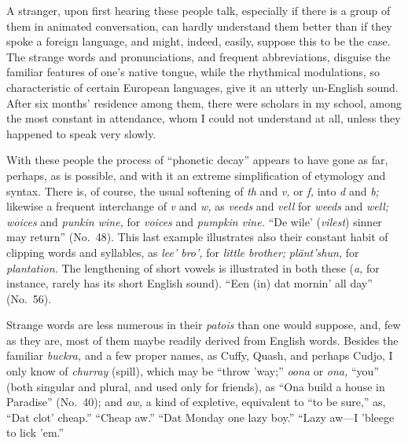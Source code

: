 \documentclass[a5paper,10pt]{book}
\begin{document}
A stranger, upon first hearing these people talk, especially if there
is a group of them in animated conversation, can hardly understand
them better than if they spoke a foreign language, and might, indeed,
easily, suppose this to be the case.  The strange words and
pronunciations, and frequent abbreviations, disguise the familiar
features of one's native tongue, while the rhythmical modulations, so
characteristic of certain European languages, give it an utterly
un-English sound.  After six months' residence among them, there were
scholars in my school, among the most constant in attendance, whom I
could not understand at all, unless they happened to speak very
slowly.

With these people the process of ``phonetic decay'' appears to have
gone as far, perhaps, as is possible, and with it an extreme
simplification of etymology and syntax.  There is, of course, the
usual softening of \emph{th} and \emph{v,} or \emph{f,} into \emph{d}
and \emph{b;} likewise a frequent interchange of \emph{v} and
\emph{w,} as \emph{veeds} and \emph{vell} for \emph{weeds} and
\emph{well;} \emph{woices} and \emph{punkin wine,} for \emph{voices}
and \emph{pumpkin vine.}  ``De wile' (\emph{vilest}) sinner may
return'' (No.~48).  This last example illustrates also their constant
habit of clipping words and syllables, as \emph{lee' bro',} for
\emph{little brother;} \emph{pl\"ant'shun,} for \emph{plantation.}
The lengthening of short vowels is illustrated in both these
(\emph{a,} for instance, rarely has its short English sound).  ``Een
(in) dat mornin' all day'' (No.~56).

Strange words are less numerous in their \emph{patois} than one would
suppose, and, few as they are, most of them maybe readily derived from
English words.  Besides the familiar \emph{buckra,} and a few proper
names, as Cuffy, Quash, and perhaps Cudjo, I only know of
\emph{churray} (spill), which may be ``throw 'way;'' \emph{oona} or
\emph{ona,} ``you'' (both singular and plural, and used only for
friends), as ``Ona build a house in Paradise'' (No.~40); and
\emph{aw,} a kind of expletive, equivalent to ``to be sure,'' as,
``Dat clot' cheap.''  ``Cheap aw.''  ``Dat Monday one lazy boy.''
``Lazy aw---I 'bleege to lick 'em.''
\end{document}

